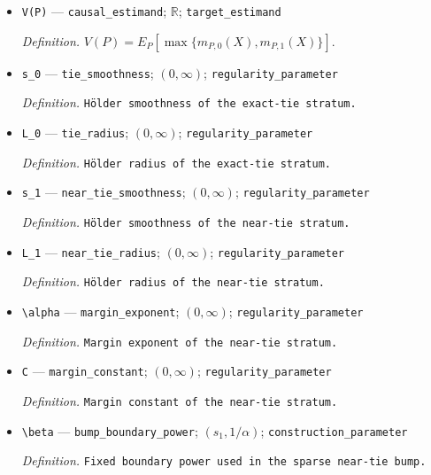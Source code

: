 \documentclass{article}
\begin{document}
\begin{itemize}
  \item \texttt{V(P)} --- \texttt{causal\_\allowbreak{}estimand}; \(\mathbb R\); \texttt{target\_\allowbreak{}estimand}
  \par\smallskip\noindent\emph{Definition.} \(V(P)=E_P[\max\{m_{P,0}(X),m_{P,1}(X)\}]\).
  \item \texttt{s\_\allowbreak{}0} --- \texttt{tie\_\allowbreak{}smoothness}; \((0,\infty)\); \texttt{regularity\_\allowbreak{}parameter}
  \par\smallskip\noindent\emph{Definition.} \texttt{Hölder smoothness of the exact-\allowbreak{}tie stratum.}
  \item \texttt{L\_\allowbreak{}0} --- \texttt{tie\_\allowbreak{}radius}; \((0,\infty)\); \texttt{regularity\_\allowbreak{}parameter}
  \par\smallskip\noindent\emph{Definition.} \texttt{Hölder radius of the exact-\allowbreak{}tie stratum.}
  \item \texttt{s\_\allowbreak{}1} --- \texttt{near\_\allowbreak{}tie\_\allowbreak{}smoothness}; \((0,\infty)\); \texttt{regularity\_\allowbreak{}parameter}
  \par\smallskip\noindent\emph{Definition.} \texttt{Hölder smoothness of the near-\allowbreak{}tie stratum.}
  \item \texttt{L\_\allowbreak{}1} --- \texttt{near\_\allowbreak{}tie\_\allowbreak{}radius}; \((0,\infty)\); \texttt{regularity\_\allowbreak{}parameter}
  \par\smallskip\noindent\emph{Definition.} \texttt{Hölder radius of the near-\allowbreak{}tie stratum.}
  \item \texttt{\textbackslash{}\allowbreak{}alpha} --- \texttt{margin\_\allowbreak{}exponent}; \((0,\infty)\); \texttt{regularity\_\allowbreak{}parameter}
  \par\smallskip\noindent\emph{Definition.} \texttt{Margin exponent of the near-\allowbreak{}tie stratum.}
  \item \texttt{C} --- \texttt{margin\_\allowbreak{}constant}; \((0,\infty)\); \texttt{regularity\_\allowbreak{}parameter}
  \par\smallskip\noindent\emph{Definition.} \texttt{Margin constant of the near-\allowbreak{}tie stratum.}
  \item \texttt{\textbackslash{}\allowbreak{}beta} --- \texttt{bump\_\allowbreak{}boundary\_\allowbreak{}power}; \((s_1,1/\alpha)\); \texttt{construction\_\allowbreak{}parameter}
  \par\smallskip\noindent\emph{Definition.} \texttt{Fixed boundary power used in the sparse near-\allowbreak{}tie bump.}

\end{itemize}
\end{document}
